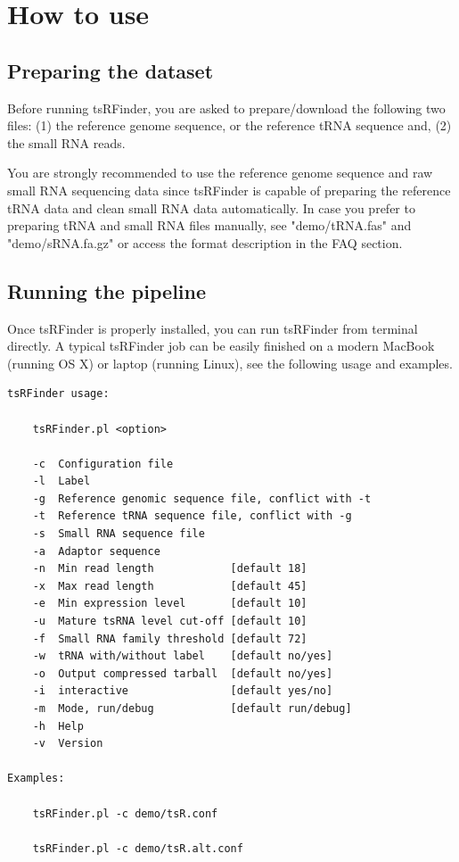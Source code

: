 \documentclass[11pt, a4paper]{article}
\begin{document}
\section{How to use}

\subsection{Preparing the dataset}

Before running tsRFinder, you are asked to prepare/download the following two files: (1) the reference genome sequence, or the reference tRNA sequence and, (2) the small RNA reads.

You are strongly recommended to use the reference genome sequence and raw small RNA sequencing data since tsRFinder is capable of preparing the reference tRNA data and clean small RNA data automatically. In case you prefer to preparing tRNA and small RNA files manually, see "demo/tRNA.fas" and "demo/sRNA.fa.gz" or access the format description in the FAQ section.

\subsection{Running the pipeline}

Once tsRFinder is properly installed, you can run tsRFinder from terminal directly. A typical tsRFinder job can be easily finished on a modern MacBook (running OS X) or laptop (running Linux), see the following usage and examples.

{\scriptsize \begin{tcolorbox}[colback=blue!5!white,colframe=pink!75!black,title=Usage of tsRFinder: ./tsRFinder.pl -h]
\begin{verbatim}
tsRFinder usage:

    tsRFinder.pl <option>

    -c  Configuration file
    -l  Label
    -g  Reference genomic sequence file, conflict with -t
    -t  Reference tRNA sequence file, conflict with -g
    -s  Small RNA sequence file
    -a  Adaptor sequence
    -n  Min read length            [default 18]
    -x  Max read length            [default 45]
    -e  Min expression level       [default 10]
    -u  Mature tsRNA level cut-off [default 10]
    -f  Small RNA family threshold [default 72]
    -w  tRNA with/without label    [default no/yes]
    -o  Output compressed tarball  [default no/yes]
    -i  interactive                [default yes/no]
    -m  Mode, run/debug            [default run/debug]
    -h  Help
    -v  Version

Examples:

    tsRFinder.pl -c demo/tsR.conf

    tsRFinder.pl -c demo/tsR.alt.conf
\end{verbatim}
\end{tcolorbox}}
\end{document}

